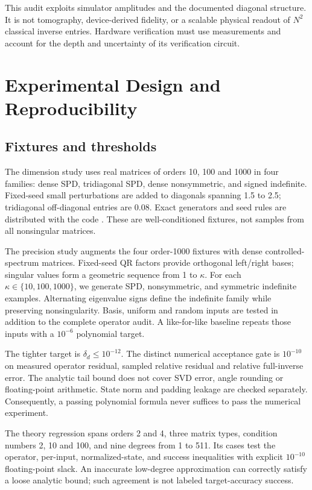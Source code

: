 \documentclass[journal]{IEEEtran}
\begin{document}
This audit exploits simulator amplitudes and the documented diagonal
structure. It is not tomography, device-derived fidelity, or a scalable
physical readout of $N^2$ classical inverse entries. Hardware verification
must use measurements and account for the depth and uncertainty of its
verification circuit.

\section{Experimental Design and Reproducibility}
\subsection{Fixtures and thresholds}
The dimension study uses real matrices of orders 10, 100 and 1000 in four
families: dense SPD, tridiagonal SPD, dense nonsymmetric, and signed
indefinite. Fixed-seed small perturbations are added to diagonals spanning
1.5 to 2.5; tridiagonal off-diagonal entries are 0.08. Exact generators and
seed rules are distributed with the code \cite{qcenncode}. These are
well-conditioned fixtures, not samples from all nonsingular matrices.

The precision study augments the four order-1000 fixtures with dense
controlled-spectrum matrices. Fixed-seed QR factors provide orthogonal
left/right bases; singular values form a geometric sequence from 1 to
$\kappa$. For each $\kappa\in\{10,100,1000\}$, we generate SPD,
nonsymmetric, and symmetric indefinite examples. Alternating eigenvalue
signs define the indefinite family while preserving nonsingularity.
Basis, uniform and random inputs are tested in addition to the complete
operator audit. A like-for-like baseline repeats those inputs with a
$10^{-6}$ polynomial target.

The tighter target is $\delta_d\leq10^{-12}$. The distinct numerical
acceptance gate is $10^{-10}$ on measured operator residual, sampled
relative residual and relative full-inverse error. The analytic tail bound
does not cover SVD error, angle rounding or floating-point arithmetic.
State norm and padding leakage are checked separately. Consequently, a
passing polynomial formula never suffices to pass the numerical experiment.

The theory regression spans orders 2 and 4, three matrix types, condition
numbers 2, 10 and 100, and nine degrees from 1 to 511. Its
\TheoryCaseCount{} cases test the operator, per-input, normalized-state,
and success inequalities with explicit $10^{-10}$ floating-point slack.
An inaccurate low-degree approximation can correctly satisfy a loose
analytic bound; such agreement is not labeled target-accuracy success.
\end{document}
